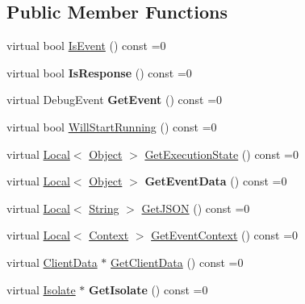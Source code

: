 \subsection*{Public Member Functions}
\begin{DoxyCompactItemize}
\item 
virtual bool \hyperlink{classv8_1_1_debug_1_1_message_a371afb8f4b2352ea15ee8c7daa7f788e}{Is\+Event} () const  =0
\item 
virtual bool {\bfseries Is\+Response} () const  =0\hypertarget{classv8_1_1_debug_1_1_message_a2f6fecc2b94673088b2909a9455dc836}{}\label{classv8_1_1_debug_1_1_message_a2f6fecc2b94673088b2909a9455dc836}

\item 
virtual Debug\+Event {\bfseries Get\+Event} () const  =0\hypertarget{classv8_1_1_debug_1_1_message_a52b16e72cacf798ba633b4afc6eccf53}{}\label{classv8_1_1_debug_1_1_message_a52b16e72cacf798ba633b4afc6eccf53}

\item 
virtual bool \hyperlink{classv8_1_1_debug_1_1_message_ae6197bbed731299fd7d49d072c5ea53a}{Will\+Start\+Running} () const  =0
\item 
virtual \hyperlink{classv8_1_1_local}{Local}$<$ \hyperlink{classv8_1_1_object}{Object} $>$ \hyperlink{classv8_1_1_debug_1_1_message_a2c7a09ecad899d9ce253399776d64e91}{Get\+Execution\+State} () const  =0
\item 
virtual \hyperlink{classv8_1_1_local}{Local}$<$ \hyperlink{classv8_1_1_object}{Object} $>$ {\bfseries Get\+Event\+Data} () const  =0\hypertarget{classv8_1_1_debug_1_1_message_a0b1b18243e91c4a525e1776e79faeb8b}{}\label{classv8_1_1_debug_1_1_message_a0b1b18243e91c4a525e1776e79faeb8b}

\item 
virtual \hyperlink{classv8_1_1_local}{Local}$<$ \hyperlink{classv8_1_1_string}{String} $>$ \hyperlink{classv8_1_1_debug_1_1_message_aa5e2fc7a5a529683bb4dc176fb788cd2}{Get\+J\+S\+ON} () const  =0
\item 
virtual \hyperlink{classv8_1_1_local}{Local}$<$ \hyperlink{classv8_1_1_context}{Context} $>$ \hyperlink{classv8_1_1_debug_1_1_message_aee14299740566b578b75a89bf485cc77}{Get\+Event\+Context} () const  =0
\item 
virtual \hyperlink{classv8_1_1_debug_1_1_client_data}{Client\+Data} $\ast$ \hyperlink{classv8_1_1_debug_1_1_message_a03ec05ff968a01bbe8bb59ac82516bce}{Get\+Client\+Data} () const  =0
\item 
virtual \hyperlink{classv8_1_1_isolate}{Isolate} $\ast$ {\bfseries Get\+Isolate} () const  =0\hypertarget{classv8_1_1_debug_1_1_message_ac19f1b6a8944959c3c5e08567e77f61d}{}\label{classv8_1_1_debug_1_1_message_ac19f1b6a8944959c3c5e08567e77f61d}

\end{DoxyCompactItemize}


